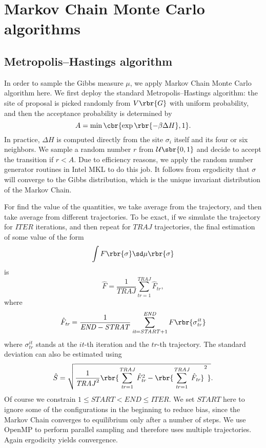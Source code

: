 \documentclass[english, nochinese]{pnote}
\begin{document}
\section{Markov Chain Monte Carlo algorithms} \label{Sec:Alg}

\subsection{Metropolis--Hastings algorithm}

In order to sample the Gibbs measure $\mu$, we apply Markov Chain Monte Carlo algorithm here. We first deploy the standard Metropolis--Hastings algorithm: the site of proposal is picked randomly from $ V \rbr{G} $ with uniform probability, and then the acceptance probability is determined by
\begin{equation}
A = \min \cbr{ \exp \rbr{ -\beta \Delta H }, 1 }.
\end{equation}
In practice, $ \Delta H $ is computed directly from the site $\sigma_i$ itself and its four or six neighbors. We sample a random number $r$ from $ \mathcal{U} \sbr{ 0, 1 } $ and decide to accept the transition if $ r < A $. Due to efficiency reasons, we apply the random number generator routines in Intel MKL to do this job. It follows from ergodicity that $\sigma$ will converge to the Gibbs distribution, which is the unique invariant distribution of the Markov Chain.

For find the value of the quantities, we take average from the trajectory, and then take average from different trajectories. To be exact, if we simulate the trajectory for $\mathit{ITER}$ iterations, and then repeat for $\mathit{TRAJ}$ trajectories, the final estimation of some value of the form
\begin{equation}
\int F \rbr{\sigma} \sd \mu \rbr{\sigma}
\end{equation}
is
\begin{equation} \label{Eq:Ave}
\hat{F} = \frac{1}{\mathit{TRAJ}} \sum_{ \textit{tr} = 1 }^{\mathit{TRAJ}} \hat{F}_{\textit{tr}},
\end{equation}
where
\begin{equation}
\hat{F}_{\textit{tr}} = \frac{1}{ \mathit{END} - \mathit{STRAT} } \sum_{ \textit{it} = \mathit{START} + 1 }^{\mathit{END}} F \rbr{\sigma_{\mathit{tr}}^{\mathit{it}}} 
\end{equation}
where $ \sigma_{\mathit{tr}}^{\mathit{it}} $ stands at the $\mathit{it}$-th iteration and the $\mathit{tr}$-th trajectory. The standard deviation can also be estimated using
\begin{equation}
\hat{S} = \sqrt{ \frac{1}{\mathit{TRAJ}^2} \rbr{ \sum_{ \mathit{tr} = 1 }^{\mathit{TRAJ}} \hat{F}_{\textit{tr}}^2 - \rbr{ \sum_{ \mathit{tr} = 1 }^{\mathit{TRAJ}} \hat{F}_{\textit{tr}} }^2 } }.
\end{equation}
Of course we constrain $ 1 \le \mathit{START} < \mathit{END} \le \mathit{ITER} $. We set $\mathit{START}$ here to ignore some of the configurations in the beginning to reduce bias, since the Markov Chain converges to equilibrium only after a number of steps. We use OpenMP to perform parallel sampling and therefore uses multiple trajectories. Again ergodicity yields convergence.
\end{document}
